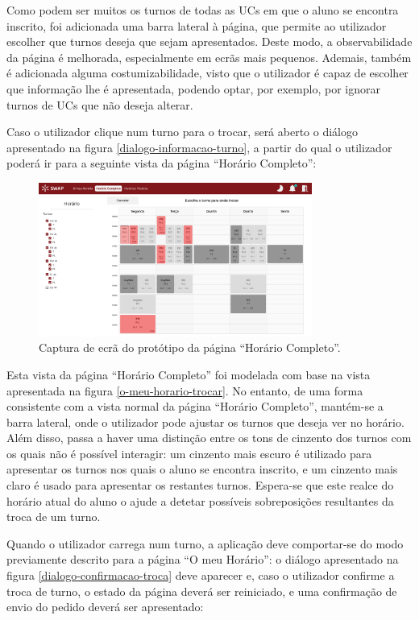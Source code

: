 \documentclass[12pt, a4paper]{article}
\begin{document}
Como podem ser muitos os turnos de todas as UCs em que o aluno se encontra inscrito, foi adicionada
uma barra lateral à página, que permite ao utilizador escolher que turnos deseja que sejam
apresentados. Deste modo, a observabilidade da página é melhorada, especialmente em ecrãs mais
pequenos. Ademais, também é adicionada alguma costumizabilidade, visto que o utilizador é capaz de
escolher que informação lhe é apresentada, podendo optar, por exemplo, por ignorar turnos de UCs
que não deseja alterar.

Caso o utilizador clique num turno para o trocar, será aberto o diálogo apresentado na figura
\ref{dialogo-informacao-turno}, a partir do qual o utilizador poderá ir para a seguinte vista da
página ``Horário Completo'':

\begin{figure}[H]
    \centering
    \includegraphics[width=0.8\textwidth]{res/prototype/horario-completo-trocar.png}
    \caption{Captura de ecrã do protótipo da página ``Horário Completo''.}
    \label{horario-completo-trocar}
\end{figure}

Esta vista da página ``Horário Completo'' foi modelada com base na vista apresentada na figura
\ref{o-meu-horario-trocar}. No entanto, de uma forma consistente com a vista normal da página
``Horário Completo'', mantém-se a barra lateral, onde o utilizador pode ajustar os turnos que deseja
ver no horário. Além disso, passa a haver uma distinção entre os tons de cinzento dos turnos com os
quais não é possível interagir: um cinzento mais escuro é utilizado para apresentar os turnos nos
quais o aluno se encontra inscrito, e um cinzento mais claro é usado para apresentar os restantes
turnos. Espera-se que este realce do horário atual do aluno o ajude a detetar possíveis
sobreposições resultantes da troca de um turno.

Quando o utilizador carrega num turno, a aplicação deve comportar-se do modo previamente descrito
para a página ``O meu Horário'': o diálogo apresentado na figura \ref{dialogo-confirmacao-troca}
deve aparecer e, caso o utilizador confirme a troca de turno, o estado da página deverá ser
reiniciado, e uma confirmação de envio do pedido deverá ser apresentado:
\end{document}
